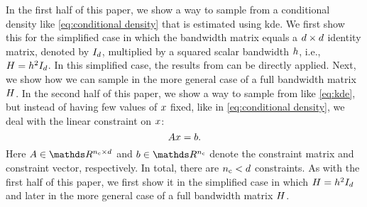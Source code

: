 In the first half of this paper, we show a way to sample from a conditional density like \cref{eq:conditional density} that is estimated using \ac{kde}. 
We first show this for the simplified case in which the bandwidth matrix equals a $d\times d$ identity matrix, denoted by $I_{d}$, multiplied by a squared scalar bandwidth $h$, i.e., $H=h^2 I_{d}$. 
In this simplified case, the results from \textcite{hyndman1996estimating, holmes2007fast} can be directly applied.
Next, we show how we can sample in the more general case of a full bandwidth matrix $H$.
In the second half of this paper, we show a way to sample from  like \cref{eq:kde}, but instead of having few values of $x$ fixed, like in \cref{eq:conditional density}, we deal with the linear constraint on $x$:
\begin{equation}
	\label{eq:linear constraint}
	A x = b.
\end{equation}
Here $\constraintmatrix \in \realnumbers^{\numberofconstraints \times \dimension}$ and $\constraintvector \in \realnumbers^{\numberofconstraints}$ denote the constraint matrix and constraint vector, respectively. 
In total, there are $n_\mathrm{c} < d$ constraints.
As with the first half of this paper, we first show it in the simplified case in which $H=h^2 I_{d}$ and later in the more general case of a full bandwidth matrix $H$.

